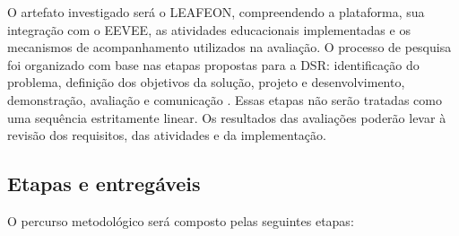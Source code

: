 O artefato investigado será o LEAFEON, compreendendo a plataforma, sua
integração com o EEVEE, as atividades educacionais implementadas e os mecanismos
de acompanhamento utilizados na avaliação. O processo de pesquisa foi organizado
com base nas etapas propostas para a DSR: identificação do problema, definição
dos objetivos da solução, projeto e desenvolvimento, demonstração, avaliação e
comunicação \cite{peffers_methodology_2007}. Essas etapas não serão tratadas
como uma sequência estritamente linear. Os resultados das avaliações poderão
levar à revisão dos requisitos, das atividades e da implementação.

\subsection{Etapas e entregáveis}

O percurso metodológico será composto pelas seguintes etapas:

